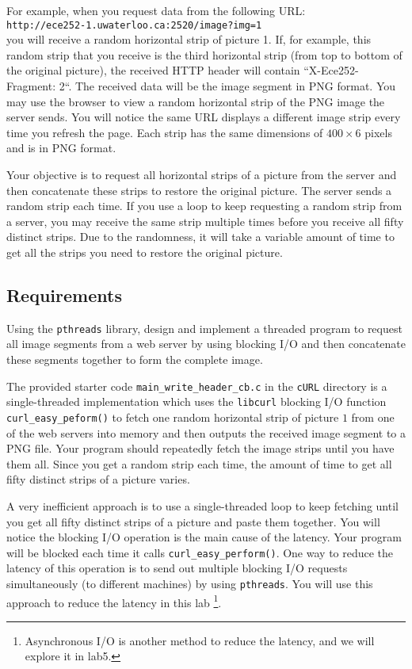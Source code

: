 For example, when you request data from the following URL: \\
\verb+http://ece252-1.uwaterloo.ca:2520/image?img=1+  \\
you will receive a random horizontal strip of picture 1. If, for example, this random strip that you receive is the third horizontal strip (from top to bottom of the original picture), the received HTTP header will contain ``X-Ece252-Fragment: 2``. The received data will be the image segment in PNG format.
You may use the browser to view a random horizontal strip of the PNG image the server sends. You will notice the same URL displays a different image strip every time you refresh the page. Each strip has the same dimensions of $400 \times 6$ pixels and is in PNG format. 

Your objective is to request all horizontal strips of a picture from the server and then concatenate these strips to restore the original picture. The server sends a random strip each time. If you use a loop to keep requesting a random strip from a server, you may receive the same strip multiple times before you receive all fifty distinct strips. Due to the randomness, it will take a variable amount of time to get all the strips you need to restore the original picture.

\subsection{Requirements}

Using the \verb+pthreads+ library, design and implement a threaded program to request all image segments from a web server by using blocking I/O and then concatenate these segments together to form the complete image.

The provided starter code \verb+main_write_header_cb.c+ in the \verb+cURL+ directory is a single-threaded implementation which uses the \verb+libcurl+ blocking I/O function \verb+curl_easy_peform()+ to fetch one random horizontal strip of picture $1$ from one of the web servers into memory and then outputs the received image segment to a PNG file. Your  program should repeatedly fetch the image strips until you have them all. Since you get a random strip each time, the amount of time to get all fifty distinct strips of a picture varies.

A very inefficient approach is to use a single-threaded loop to keep fetching until you get all fifty distinct strips of a picture and paste them together. You will notice the blocking I/O operation is the main cause of the latency. Your program will be blocked each time it calls \verb+curl_easy_perform()+. One way to reduce the latency of this operation is to send out multiple blocking I/O requests simultaneously (to different machines) by using \verb+pthreads+. You will use this approach to reduce the latency in this lab
\footnote{Asynchronous I/O is another method to reduce the latency, and we will explore it in lab5.}. 

